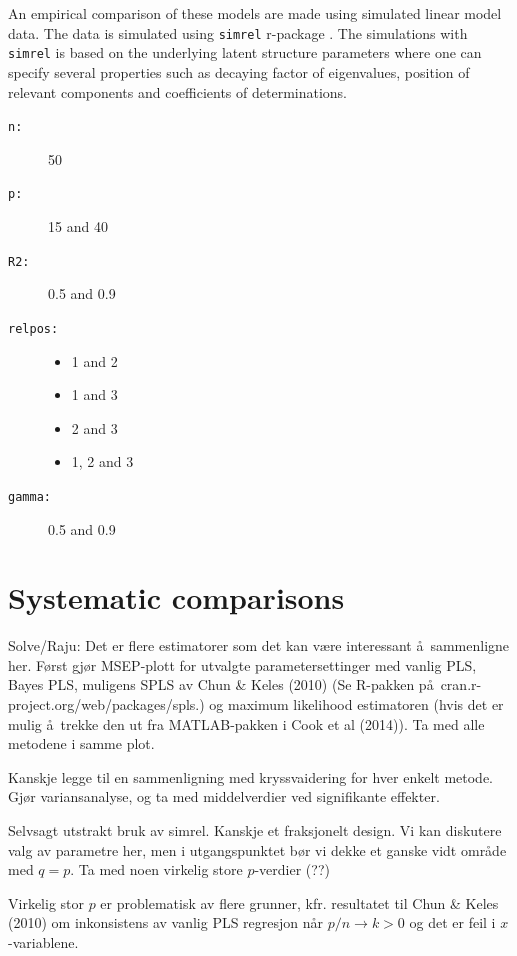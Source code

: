 \documentclass[a4paper, 11pt]{article}
\begin{document}
An empirical comparison of these models are made using simulated linear model
data. The data is simulated using {\tt simrel} r-package
\citep{saebo2015simrel}. The simulations with {\tt simrel} is based on the
underlying latent structure parameters where one can specify several properties
such as decaying factor of eigenvalues, position of relevant components and
coefficients of determinations.

\setlength{\itemsep}{0mm}\setlength{\parskip}{0mm}
\begin{description}
\item[{\tt n:}] 50
\item[{\tt p:} ] 15 and 40
\item[{\tt R2:} ] 0.5 and 0.9
\item[{\tt relpos:} ] \hfill
  \begin{itemize}[label=$\triangleright$]
  \item 1 and 2
  \item 1 and 3
  \item 2 and 3
  \item 1, 2 and 3
  \end{itemize}
\item[{\tt gamma:} ] 0.5 and 0.9
\end{description}




\section{Systematic comparisons}

Solve/Raju: Det er flere estimatorer som det kan v\ae re interessant \aa\ sammenligne her. F\o rst gj\o r MSEP-plott for utvalgte parametersettinger med vanlig PLS, Bayes PLS, muligens SPLS av Chun \& Keles (2010)  (Se R-pakken p\aa\ cran.r-project.org/web/packages/spls.) og maximum likelihood estimatoren (hvis det er mulig \aa\ trekke den ut fra MATLAB-pakken i Cook et al (2014)). Ta med alle metodene i samme plot. 

Kanskje legge til en sammenligning med kryssvaidering for hver enkelt metode. Gj\o r variansanalyse, og ta med middelverdier ved signifikante effekter.

Selvsagt utstrakt bruk av simrel. Kanskje et fraksjonelt design. Vi kan diskutere valg av parametre her, men i utgangspunktet b\o r vi dekke et ganske vidt omr\aa de med $q=p$. Ta med noen virkelig store $p$-verdier (??)  

Virkelig stor $p$ er problematisk av flere grunner, kfr. resultatet til Chun \&
Keles (2010) om inkonsistens av vanlig PLS regresjon når $p/n\rightarrow k>0$ og
det er feil i $x$-variablene. 
\end{document}
